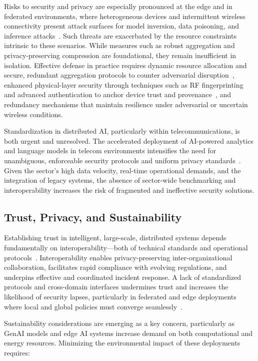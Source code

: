 \documentclass[sigconf]{acmart}
\begin{document}
Risks to security and privacy are especially pronounced at the edge and in federated environments, where heterogeneous devices and intermittent wireless connectivity present attack surfaces for model inversion, data poisoning, and inference attacks~\cite{ref17,ref19,ref23,ref24}. Such threats are exacerbated by the resource constraints intrinsic to these scenarios. While measures such as robust aggregation and privacy-preserving compression are foundational, they remain insufficient in isolation. Effective defense in practice requires dynamic resource allocation and secure, redundant aggregation protocols to counter adversarial disruption~\cite{ref49}, enhanced physical-layer security through techniques such as RF fingerprinting and advanced authentication to anchor device trust and provenance~\cite{ref48}, and redundancy mechanisms that maintain resilience under adversarial or uncertain wireless conditions.

Standardization in distributed AI, particularly within telecommunications, is both urgent and unresolved. The accelerated deployment of AI-powered analytics and language models in telecom environments intensifies the need for unambiguous, enforceable security protocols and uniform privacy standards~\cite{ref42,ref44,ref49}. Given the sector's high data velocity, real-time operational demands, and the integration of legacy systems, the absence of sector-wide benchmarking and interoperability increases the risk of fragmented and ineffective security solutions.

\subsection{Trust, Privacy, and Sustainability}

Establishing trust in intelligent, large-scale, distributed systems depends fundamentally on interoperability—both of technical standards and operational protocols~\cite{ref7,ref17,ref18,ref19,ref20,ref21,ref23,ref24,ref26}. Interoperability enables privacy-preserving inter-organizational collaboration, facilitates rapid compliance with evolving regulations, and underpins effective and coordinated incident response. A lack of standardized protocols and cross-domain interfaces undermines trust and increases the likelihood of security lapses, particularly in federated and edge deployments where local and global policies must converge seamlessly~\cite{ref26}.

Sustainability considerations are emerging as a key concern, particularly as GenAI models and edge AI systems increase demand on both computational and energy resources. Minimizing the environmental impact of these deployments requires:
\end{document}
